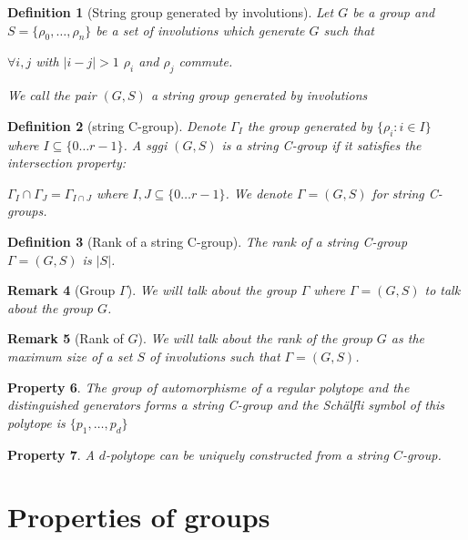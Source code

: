 \documentclass[a4paper]{article}
\theoremstyle{mytheorem}
\newtheorem{definition}{Definition}[section]
\newtheorem{remark}[definition]{Remark}
\newtheorem{property}[definition]{Property}
\begin{document}
\begin{definition}[String group generated by involutions]
  Let $G$ be a group and $S = \{\rho_0, \dots, \rho_n\}$ be a set of involutions which generate $G$ such that
  \begin{center}
    $\forall i,j$ with $| i - j| > 1$ $\rho_i$ and $\rho_j$ commute.
  \end{center}
  We call the pair $(G,S)$ a \textit{string group generated by involutions}
\end{definition}

\begin{definition}[string C-group]
  Denote $\Gamma_I$ the group generated by $\{\rho_i : i \in I\}$ where $I \subseteq \{0\dots r-1\}$. A sggi $(G,S)$ is a \textit{string C-group} if it satisfies the intersection property:
  \begin{center}
    $\Gamma_I \cap \Gamma_J = \Gamma_{I \cap J}$ where $I, J \subseteq \{0\dots r-1\}$. We denote $\Gamma = (G,S)$ for string C-groups.
  \end{center}
\end{definition}

\begin{definition}[Rank of a string C-group]
  The \textit{rank of a string C-group} $\Gamma = (G,S)$ is $|S|$.
\end{definition}

\begin{remark}[Group $\Gamma$]
  We will talk about the group $\Gamma$ where $\Gamma = (G,S)$ to talk about the group $G$.
\end{remark}

\begin{remark}[Rank of $G$]
  We will talk about the rank of the group $G$ as the maximum size of a set $S$ of involutions such that $\Gamma = (G,S)$.
\end{remark}

\begin{property}
  The group of automorphisme of a regular polytope and the distinguished generators forms a string C-group and the Schälfli symbol of this polytope is $\{p_1, \dots, p_d\}$
\end{property}

\begin{property}
  A $d$-polytope can be uniquely constructed from a string $C$-group.
\end{property}

\section{Properties of groups}
\end{document}
